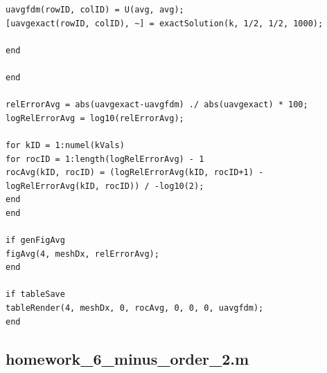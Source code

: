 \documentclass[10pt]{article}		%
\numberwithin{equation}{section}
\begin{document}
\begin{lstlisting}
uavgfdm(rowID, colID) = U(avg, avg);
[uavgexact(rowID, colID), ~] = exactSolution(k, 1/2, 1/2, 1000);

end

end

relErrorAvg = abs(uavgexact-uavgfdm) ./ abs(uavgexact) * 100;
logRelErrorAvg = log10(relErrorAvg);

for kID = 1:numel(kVals)
for rocID = 1:length(logRelErrorAvg) - 1
rocAvg(kID, rocID) = (logRelErrorAvg(kID, rocID+1) - logRelErrorAvg(kID, rocID)) / -log10(2);
end
end

if genFigAvg
figAvg(4, meshDx, relErrorAvg);
end

if tableSave
tableRender(4, meshDx, 0, rocAvg, 0, 0, 0, uavgfdm);
end
\end{lstlisting}

\subsection{homework\_6\_minus\_order\_2.m}
\end{document}
